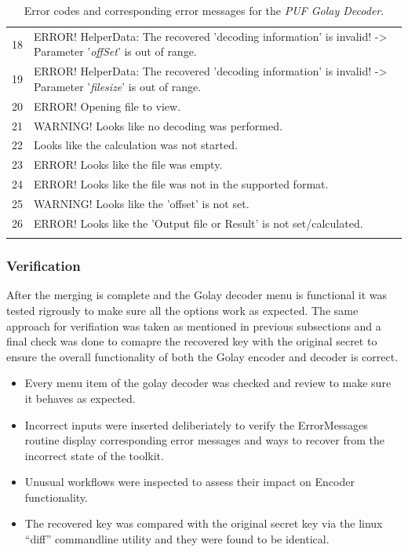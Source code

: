 \begin{table}[!ht]
\begin{center}
\begin{tabular}{cp{13cm}}
18 & ERROR! HelperData: The recovered 'decoding information' is invalid! -> Parameter '\emph{offSet}' is out of range.\\

19 & ERROR! HelperData: The recovered 'decoding information' is invalid! -> Parameter '\emph{filesize}' is out of range.\\

20 & ERROR! Opening file to view.\\

21 & WARNING! Looks like no decoding was performed.\\

22 & Looks like the calculation was not started.\\

23 & ERROR! Looks like the file was empty.\\

24 & ERROR! Looks like the file was not in the supported format.\\

25 & WARNING! Looks like the 'offset' is not set.\\

26 & ERROR! Looks like the 'Output file or Result' is not set/calculated.\\
\addlinespace
\bottomrule
\end{tabular}
\end{center}
\caption{Error codes and corresponding error messages for the \emph{PUF Golay Decoder}.}
\label{tab:Golay_dec_errors}
\end{table}

\subsubsection{Verification}
After the merging is complete and the Golay decoder menu is functional it was tested rigrously to make sure all the options work as expected. The same approach for verifiation was taken as mentioned in previous subsections and a final check was done to comapre the recovered key with the original secret to ensure the overall functionality of both the Golay encoder and decoder is correct.

\begin{itemize}
	\item Every menu item of the golay decoder was checked and review to make sure it behaves as expected.
	\item Incorrect inputs were inserted deliberiately to verify the ErrorMessages routine display corresponding error messages and ways to recover from the incorrect state of the toolkit.
	\item Unusual workflows were inspected to assess their impact on Encoder functionality.
	\item The recovered key was compared with the original secret key via the linux ``diff'' commandline utility and they were found to be identical.
\end{itemize}


